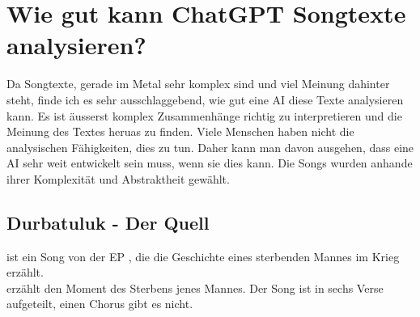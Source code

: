 \documentclass[twocolumn,10pt]{article}
\begin{document}
	\pagebreak
	\section{Wie gut kann ChatGPT Songtexte analysieren?}
		Da Songtexte, gerade im Metal sehr komplex sind und viel Meinung dahinter steht, finde ich es sehr ausschlaggebend, wie gut eine AI diese Texte analysieren kann. Es ist äusserst komplex Zusammenhänge richtig zu interpretieren und die Meinung des Textes heruas zu finden. Viele Menschen haben nicht die analysischen Fähigkeiten, dies zu tun. Daher kann man davon ausgehen, dass eine AI sehr weit entwickelt sein muss, wenn sie dies kann. Die Songs wurden anhande ihrer Komplexität und Abstraktheit gewählt.
		\subsection{Durbatuluk - Der Quell}
			 ist ein Song von der EP , die die Geschichte eines sterbenden Mannes im Krieg erzählt.\cite{Mail}\\
			 erzählt den Moment des Sterbens jenes Mannes. Der Song ist in sechs Verse aufgeteilt, einen Chorus gibt es nicht.
\end{document}
